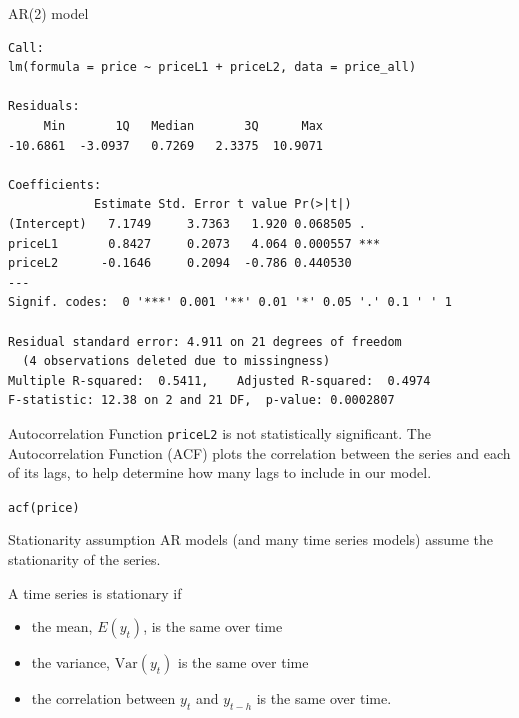 \documentclass{beamer}\usepackage[]{graphicx}\usepackage[]{color}
\makeatletter
\newcommand{\hlstd}[1]{\textcolor[rgb]{1,0.894,0.769}{#1}}%
\newcommand{\hlkwd}[1]{\textcolor[rgb]{1,0.78,0.769}{#1}}%
\newenvironment{kframe}{%
 \def\at@end@of@kframe{}%
 \ifinner\ifhmode%
  \def\at@end@of@kframe{\end{minipage}}%
  \begin{minipage}{\columnwidth}%
 \fi\fi%
 \def\FrameCommand##1{\hskip\@totalleftmargin \hskip-\fboxsep
 \colorbox{shadecolor}{##1}\hskip-\fboxsep
     \hskip-\linewidth \hskip-\@totalleftmargin \hskip\columnwidth}%
 \MakeFramed {\advance\hsize-\width
   \@totalleftmargin\z@ \linewidth\hsize
   \@setminipage}}%
 {\par\unskip\endMakeFramed%
 \at@end@of@kframe}
\newenvironment{knitrout}{}{} %
\makeatother
\begin{document}
\begin{darkframes}
\begin{frame}[fragile]{AR(2) model}
\begin{knitrout}
\begin{kframe}
\begin{verbatim}
Call:
lm(formula = price ~ priceL1 + priceL2, data = price_all)

Residuals:
     Min       1Q   Median       3Q      Max 
-10.6861  -3.0937   0.7269   2.3375  10.9071 

Coefficients:
            Estimate Std. Error t value Pr(>|t|)    
(Intercept)   7.1749     3.7363   1.920 0.068505 .  
priceL1       0.8427     0.2073   4.064 0.000557 ***
priceL2      -0.1646     0.2094  -0.786 0.440530    
---
Signif. codes:  0 '***' 0.001 '**' 0.01 '*' 0.05 '.' 0.1 ' ' 1

Residual standard error: 4.911 on 21 degrees of freedom
  (4 observations deleted due to missingness)
Multiple R-squared:  0.5411,	Adjusted R-squared:  0.4974 
F-statistic: 12.38 on 2 and 21 DF,  p-value: 0.0002807
\end{verbatim}
\end{kframe}
\end{knitrout}
    \end{frame}
    
    
    
    \begin{frame}[fragile]{Autocorrelation Function}  
      \texttt{priceL2} is not statistically significant. \pause      
      The \alert{Autocorrelation Function (ACF)} plots the correlation between the series and each of its lags, to help determine how many lags to include in our model.
\begin{knitrout}
\begin{kframe}
\begin{alltt}
\hlkwd{acf}\hlstd{(price)}
\end{alltt}
\end{kframe}


\end{knitrout}
    \end{frame}
    
    
    
    \begin{frame}[fragile]{Stationarity assumption} 
      AR models (and many time series models) assume the stationarity of the series. \pause
      \bigskip
      
      A time series is \alert{stationary} if
      \begin{itemize}
        \item the mean, $E(y_t)$, is the same over time
        \item the variance, $\text{Var}(y_t)$ is the same over time
        \item the correlation between $y_t$ and $y_{t-h}$ is the same over time.
      \end{itemize}
    

\end{frame}
\end{darkframes}
\end{document}

